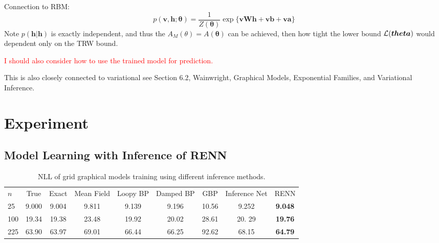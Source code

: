 Connection to RBM:
\begin{equation}
  p(\bm{v}, \bm{h}; \bm{\theta}) = \frac{1}{Z(\bm{\theta})} \exp\{\bm{v}\bm{W}\bm{h} + \bm{v}\bm{b} + \bm{v}\bm{a}\}
\end{equation}
Note $p(\bm{h}|\bm{h})$ is exactly independent, and thus the $A_{M}(\theta) = A(\bm{\theta})$ can be achieved, then how tight the lower bound $\mathcal{L}(\bm{theta})$ would dependent only on the TRW bound.


\textcolor{red}{I should also consider how to use the trained model for prediction.}

This is also closely connected to variational see Section 6.2, Wainwright, Graphical Models, Exponential Families, and Variational Inference.
\section{Experiment}



\subsection{Model Learning with Inference of RENN}


\begin{table*}[t]
  \caption{NLL of grid graphical models training using different inference methods.}
  \label{tab:nll-training-grid-n5n10}
  \begin{center}
    \begin{small}
      
        \begin{tabular}{lcccccccc}
          \toprule
          $n$ & True & Exact & Mean Field & Loopy BP & Damped BP & GBP & Inference Net & RENN \\
          25  &  9.000  &  9.004  &  9.811  &  {9.139}  &  9.196  &  10.56  &  9.252  &  \textbf{9.048}  \\
          100 &  19.34  &  19.38  &  23.48  &  {19.92}  &  20.02  &  28.61  &  20. 29  &  \textbf{19.76} \\
          225 &  63.90  &  63.97  &  69.01  &  66.44    &  66.25  &  92.62  &  68.15  &  \textbf{64.79}  \\
          \bottomrule
        \end{tabular}
      
    \end{small}
  \end{center}
\end{table*}


